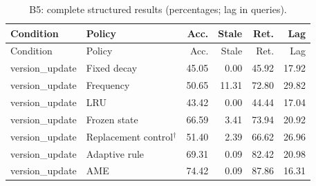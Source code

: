 \begin{longtable}{llrrrr}\caption{B5: complete structured results (percentages; lag in queries).}\label{tab:B5}\\\toprule Condition & Policy & Acc. & Stale & Ret. & Lag\\\midrule\endfirsthead\toprule Condition & Policy & Acc. & Stale & Ret. & Lag\\\midrule\endhead
version\_update & Fixed decay & 45.05 & 0.00 & 45.92 & 17.92\\
version\_update & Frequency & 50.65 & 11.31 & 72.80 & 29.82\\
version\_update & LRU & 43.42 & 0.00 & 44.44 & 17.04\\
version\_update & Frozen state & 66.59 & 3.41 & 73.94 & 20.92\\
version\_update & Replacement control$^{\dagger}$ & 51.40 & 2.39 & 66.62 & 26.96\\
version\_update & Adaptive rule & 69.31 & 0.09 & 82.42 & 20.98\\
version\_update & AME & 74.42 & 0.09 & 87.86 & 16.31\\
\bottomrule\end{longtable}